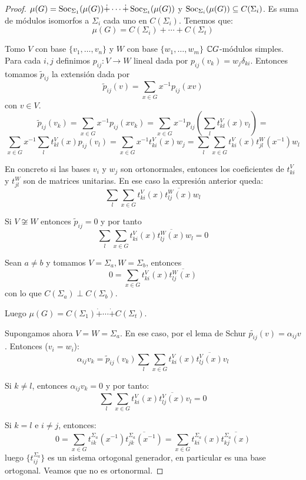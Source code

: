 \begin{proof}
  \(\mu(G)=\operatorname{Soc}_{\Sigma_1}(\mu(G))\dot{+}\cdots\dot{+}\operatorname{Soc}_{\Sigma_t}(\mu(G))\)
  y \(\operatorname{Soc}_{\Sigma_i}(\mu(G))\subseteq C(\Sigma_i)\). Es suma de módulos
  isomorfos a \(\Sigma_i\) cada uno en \(C(\Sigma_i)\).
  Tenemos que:
  \[
    \mu(G)=C(\Sigma_i)+\cdots+C(\Sigma_t)
  \]

  Tomo \(V\) con base \(\{v_1,\ldots, v_n\}\) y \(W\) con base
  \(\{w_1,\ldots,w_m\}\) \(\mathbb{C} G\)-módulos simples. Para cada \(i,j\)
  definimos \(p_{ij}:V\longrightarrow W\) lineal dada por
  \(p_{ij}(v_k)=w_j\delta_{ki}\). Entonces tomamos
  \(\tilde{p}_{ij}\) la extensión dada por
  \[
    \tilde{p}_{ij}(v)=\sum_{x\in G}x^{-1} p_{ij}(xv)
  \]
  con \(v\in V\).
  \[
    \tilde{p}_{ij}(v_k)=\sum_{x\in G}x^{-1} p_{ij}(xv_k)=
  \sum_{x\in G}x^{-1} p_{ij}\left(\sum_l t^V_{kl}(x) v_l\right)=
\]\[
  \sum_{x\in G}x^{-1} \sum_l t^V_{kl}(x) p_{ij}(v_l)=
  \sum_{x\in G}x^{-1} t^V_{ki}(x) w_j=
  \sum_l\sum_{x\in G} t^V_{ki}(x) t_{jl}^W(x^{-1}) w_l
  \]

  En concreto si las bases \(v_i\) y \(w_j\) son ortonormales, entonces
  los coeficientes de \(t_{ki}^V\) y \(t_{jl}^W\) son de matrices
  unitarias. En ese caso la expresión anterior queda:
  \[
    \sum_l\sum_{x\in G} t^V_{ki}(x) \overline{t_{lj}^W(x)} w_l
  \]

  Si \(V\not\cong W\) entonces \(\tilde{p}_{ij}=0\) y por tanto
  \[
    \sum_l\sum_{x\in G} t^V_{ki}(x) \overline{t_{lj}^W(x)} w_l=0
  \]

  Sean \(a\neq b\) y tomamos \(V=\Sigma_a, W=\Sigma_b\), entonces
  \[
    0=\sum_{x\in G} t^V_{ki}(x) \overline{t_{lj}^W(x)}
  \]
  con lo que \(C(\Sigma_a)\perp C(\Sigma_b)\).

  Luego \(\mu(G)=C(\Sigma_1)\dot{+}\cdots\dot{+}C(\Sigma_t)\).

  Supongamos ahora \(V=W=\Sigma_a\). En ese caso, por el lema de Schur
  \(\tilde{p_{ij}}(v)=\alpha_{ij} v\). Entonces (\(v_i=w_i\)):
  \[
    \alpha_{ij} v_k = \tilde{p}_{ij}(v_k)
    \sum_l\sum_{x\in G} t^V_{ki}(x) \overline{t_{lj}^V(x)} v_l
  \]

  Si \(k\neq l\), entonces \(\alpha_{ij} v_k=0\) y por tanto:
  \[
    \sum_l\sum_{x\in G} t^V_{ki}(x) \overline{t_{lj}^V(x)} v_l=0
  \]

  Si \(k=l\) e \(i\neq j\), entonces:
  \[
    0=\sum_{x\in G}
    t_{ik}^{\Sigma_a}(x^{-1})\overline{t_{jk}^{\Sigma_a}(x^{-1})}
    =\sum_{x\in G} t_{ki}^{\Sigma_a}(x)\overline{t_{kj}^{\Sigma_a}(x)}
  \]
  luego \(\{t_{ij}^{\Sigma_a}\}\) es un sistema ortogonal generador,
  en particular es una base ortogonal. Veamos que no es ortonormal.


\end{proof}
